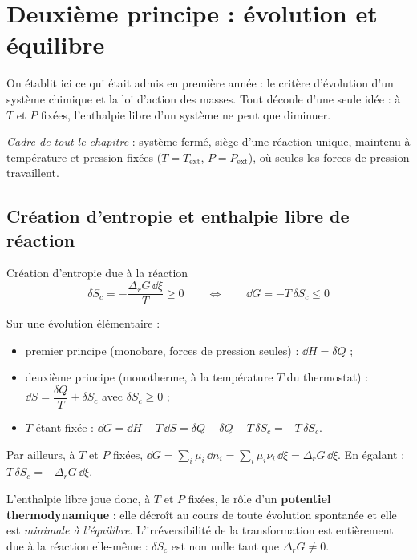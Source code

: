 \chapter{Deuxième principe : évolution et équilibre}
\label{ch:evolution}

On établit ici ce qui était admis en première année : le critère d'évolution d'un système chimique et la loi d'action des masses. Tout découle d'une seule idée : à $T$ et $P$ fixées, l'enthalpie libre d'un système ne peut que diminuer.

\noindent\emph{Cadre de tout le chapitre} : système fermé, siège d'une réaction unique, maintenu à température et pression fixées ($T = T_{\text{ext}}$, $P = P_{\text{ext}}$), où seules les forces de pression travaillent.

\section{Création d'entropie et enthalpie libre de réaction}

\begin{resultat}{Création d'entropie due à la réaction}
\[ \boxed{\delta S_c = -\frac{\Delta_rG\,\dd\xi}{T} \geq 0} \qquad\Longleftrightarrow\qquad \dd G = -T\,\delta S_c \leq 0 \]
\end{resultat}

\begin{demo}
Sur une évolution élémentaire :
\begin{itemize}
  \item premier principe (monobare, forces de pression seules) : $\dd H = \delta Q$ ;
  \item deuxième principe (monotherme, à la température $T$ du thermostat) : $\dd S = \dfrac{\delta Q}{T} + \delta S_c$ avec $\delta S_c \geq 0$ ;
  \item $T$ étant fixée : $\dd G = \dd H - T\,\dd S = \delta Q - \delta Q - T\,\delta S_c = -T\,\delta S_c$.
\end{itemize}
Par ailleurs, à $T$ et $P$ fixées, $\dd G = \sum_i\mu_i\,\dd n_i = \sum_i\mu_i\nu_i\,\dd\xi = \Delta_rG\,\dd\xi$. En égalant : $T\,\delta S_c = -\Delta_rG\,\dd\xi$.
\end{demo}

L'enthalpie libre joue donc, à $T$ et $P$ fixées, le rôle d'un \textbf{potentiel thermodynamique} : elle décroît au cours de toute évolution spontanée et elle est \emph{minimale à l'équilibre}. L'irréversibilité de la transformation est entièrement due à la réaction elle-même : $\delta S_c$ est non nulle tant que $\Delta_rG \neq 0$.

